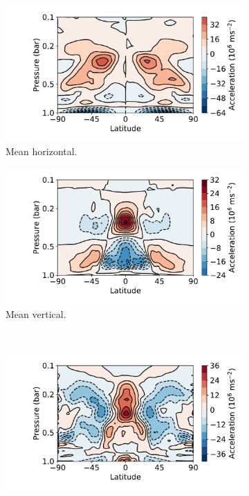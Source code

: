 \begin{figure}
  \centering
  \begin{subfigure}[t]{0.45\textwidth}
    \includegraphics[width=\textwidth]{figures/eqm-zonal-flow/0_flux.pdf}
    \caption{Mean horizontal.}
  \end{subfigure}
  \begin{subfigure}[t]{0.45\textwidth}
    \includegraphics[width=\textwidth]{figures/eqm-zonal-flow/1_flux.pdf}
    \caption{Mean vertical.}
  \end{subfigure}
  \\
  \begin{subfigure}[t]{0.45\textwidth}
    \includegraphics[width=\textwidth]{figures/eqm-zonal-flow/2_flux.pdf}

\end{subfigure}
\end{figure}
